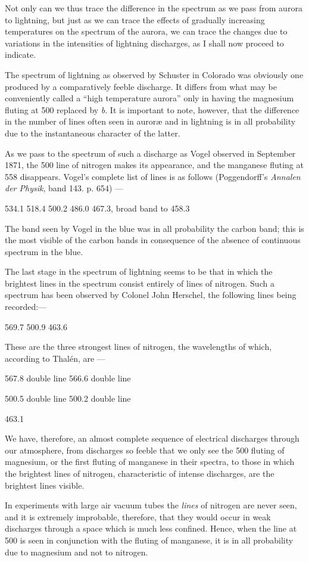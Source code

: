 \documentclass[a4paper, 12pt, oneside, polutonikogreek, english]{article}
\begin{document}
Not only can we thus trace the difference in the spectrum as we pass from aurora to lightning, but just as we can trace the effects of gradually increasing temperatures on the spectrum of the aurora, we can trace the changes due to variations in the intensities of lightning discharges, as I shall now proceed to indicate.

The spectrum of lightning as observed by Schuster in Colorado was obviously one produced by a comparatively feeble discharge. It differs from what may be conveniently called a ``high temperature aurora'' only in having the magnesium fluting at 500 replaced by \emph{b}. It is important to note, however, that the difference in the number of lines often seen in auroræ and in lightning is in all probability due to the instantaneous character of the latter.

As we pass to the spectrum of such a discharge as Vogel observed in September 1871, the 500 line of nitrogen makes its appearance, and the manganese fluting at 558 disappears. Vogel's complete list of lines is as follows (Poggendorff's \emph{Annalen der Physik}, band 143. p. 654) ---

534.1 
518.4 
500.2 
486.0 
467.3, broad band 
to 458.3

The band seen by Vogel in the blue was in all probability the carbon band; this is the most visible of the carbon bands in consequence of the absence of continuous spectrum in the blue.

The last stage in the spectrum of lightning seems to be that in which the brightest lines in the spectrum consist entirely of lines of nitrogen. Such a spectrum has been observed by Colonel John Herschel, the following lines being recorded:---

569.7 
500.9 
463.6 

These are the three strongest lines of nitrogen, the wavelengths of which, according to Thalén, are ---

567.8 double line 
566.6 double line 

500.5 double line 
500.2 double line 

463.1 

We have, therefore, an almost complete sequence of electrical discharges through our atmosphere, from discharges so feeble that we only see the 500 fluting of magnesium, or the first fluting of manganese in their spectra, to those in which the brightest lines of nitrogen, characteristic of intense discharges, are the brightest lines visible.

In experiments with large air vacuum tubes the \emph{lines} of nitrogen are never seen, and it is extremely improbable, therefore, that they would occur in weak discharges through a space which is much less confined. Hence, when the line at 500 is seen in conjunction with the fluting of manganese, it is in all probability due to magnesium and not to nitrogen.
\end{document}
